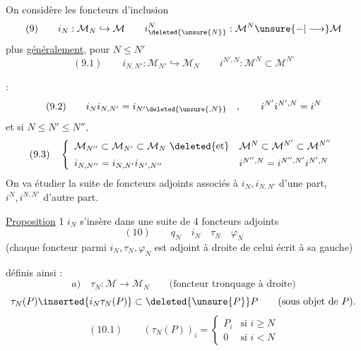 On considère les foncteurs d'inclusion
\[
(9)\qquad i_N:\mathcal M_N\hookrightarrow\mathcal M\qquad
 i^N_{\deleted{\unsure{N}}}:\mathcal M^N\unsure{-|\longrightarrow}\mathcal M
\]
plus \uline{généralement}, pour $N\leq N'$
\[
(9.1)\qquad i_{N,N'}:\mathcal M_{N'}\hookrightarrow\mathcal M_N\qquad
 i^{N',N}:\mathcal M^N\subset\mathcal M^{N'}
\]

 :
\[
(9.2)\qquad i_Ni_{N,N'}=i_{N'\deleted{\unsure{,N}}}\quad,\qquad
 i^{N'}i^{N',N}=i^N
\]
 et si $N\leq N'\leq N''$,\quad {} 
\[
(9.3)\quad\left\{\begin{array}{ll}
\mathcal M_{N''}\subset\mathcal M_{N'}\subset\mathcal M_N\ \deleted{\text{et}}&\mathcal M^N\subset\mathcal M^{N'}\subset\mathcal M^{N''}\\[1ex]
i_{N,N''}=i_{N,N'}i_{N',N''}&i^{N'',N}=i^{N'',N'}i^{N',N}
\end{array}\right.
\]
On va étudier la suite de foncteurs adjoints associés à $i_N,i_{N,N'}$ d'une part, $i^N,i^{N,N'}$ d'autre part.

\uline{Proposition} 1 $i_N$ s'insère dans une suite de 4 foncteurs adjoints
\[
(10)\qquad q_N\quad i_N\quad\tau_N\quad\varphi_N
\]
(chaque foncteur  parmi $i_N,\tau_N,\varphi_N$ est adjoint à droite de celui écrit à sa gauche)

définis ainsi :
\[
a)\quad\tau_N:\mathcal M\longrightarrow\mathcal M_N\qquad
\text{(foncteur tronquage à droite)}
\]
\[
\tau_N(P)\inserted{i_N\tau_N(P)}\subset\deleted{\unsure{P}}P\qquad\text{(sous objet de }P\text{)}.
\]
\[
(10.1)\qquad(\tau_N(P))_i=\left\{\begin{array}{ll}P_i&\text{si }i\geq N\\0&\text{si }i<N\end{array}\right.
\]
